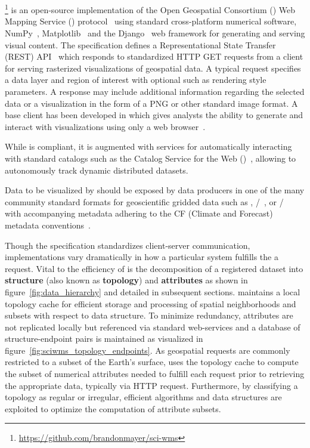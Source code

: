 \section{\sciwms{}}
\label{sec:sciwms}
\Sciwms{}\footnote{\url{https://github.com/brandonmayer/sci-wms}} is
an open-source \python{} implementation of the Open Geospatial
Consortium (\ogc{}) Web Mapping Service (\wms{}) protocol~\cite{wms14}
using standard cross-platform numerical software,
NumPy~\cite{numpy11}, Matplotlib~\cite{hunter07} and
the Django~\cite{django} web framework for generating and serving visual
content. The \ogcwms{} specification defines a Representational State
Transfer (REST) API~\cite{Fielding02} which responds to standardized
HTTP GET requests from a \wms{} client for serving rasterized
visualizations of geospatial data. A typical \wms{} request specifies
a data layer and region of interest with optional \metadata{} such as
rendering style parameters. A \wms{} response may include additional
information regarding the selected data or a visualization in the form
of a PNG or other standard image format. A base \wms{} client has been
developed in \javascript{} which gives analysts the ability to
generate and interact with visualizations using only a web
browser~\cite{comtui}.

While \sciwms{} is \ogcwms{} compliant, it is augmented with services
for automatically interacting with standard \metadata{} catalogs such
as the \ogc{} Catalog Service for the Web (\csw{})~\cite{csw14},
allowing \sciwms{} to autonomously track dynamic distributed datasets.

Data to be visualized by \sciwms{} should be exposed by data producers
in one of the many community standard formats for geoscientific
gridded data such as \netcdf{}, \hdf{}/~\cite{hdf5}, or
\grib{}/~\cite{grib2} with accompanying metadata adhering to the
CF (Climate and Forecast) metadata conventions~\cite{cf}.

Though the \ogcwms{} specification standardizes client-server
communication, implementations vary dramatically in how a
particular system fulfills the a \wms{} request. Vital to
the efficiency of \sciwms{} is the decomposition of a registered
dataset into \textbf{structure} (also known as \textbf{topology}) and
\textbf{attributes} as shown in figure~\ref{fig:data_hierarchy} and
detailed in subsequent sections. \Sciwms{} maintains a local topology
cache for efficient storage and processing of spatial neighborhoods
and subsets with respect to data structure. To minimize redundancy,
attributes are not replicated locally but referenced via standard
web-services and a database of structure-endpoint pairs is maintained
as visualized in figure~\ref{fig:sciwms_topology_endpoints}. As
geospatial \wms{} requests are commonly restricted to a subset of the
Earth's surface, \sciwms{} uses the topology cache to compute the
subset of numerical attributes needed to fulfill each request prior to
retrieving the appropriate data, typically via HTTP request. Furthermore, by
classifying a topology as regular or irregular, efficient algorithms
and data structures are exploited to optimize the computation of
attribute subsets.
